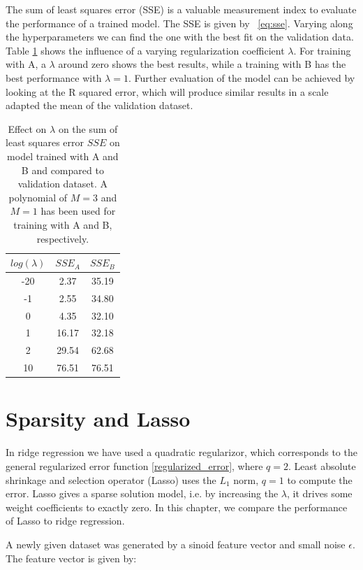 The sum of least squares error (SSE) is a valuable measurement index to evaluate the performance of a trained model. The SSE is given by ~\cref{eq:sse}. Varying along the hyperparameters we can find the one with the best fit on the validation data. Table \ref{table_sse} shows the influence of a varying regularization coefficient $\lambda$. For training with A, a $\lambda$ around zero shows the best results, while a training with B has the best performance with $\lambda = 1$. Further evaluation of the model can be achieved by looking at the R squared error, which will produce similar results in a scale adapted the mean of the validation dataset. 

\begin{table}[ht!]
\centering
\begin{tabular}{||c c c||}  
 \hline
 $log(\lambda)$ & $SSE_A$ & $SSE_B$ \\ [0.5ex] 
 \hline\hline
 -20 & 2.37 & 35.19 \\ 
 \hline
 -1 & 2.55 & 34.80 \\
 \hline
 0 & 4.35 & 32.10 \\
 \hline
 1 & 16.17 & 32.18 \\
 \hline
 2 & 29.54 & 62.68 \\
 \hline
 10 & 76.51 & 76.51 \\ [1ex] 
 \hline
\end{tabular}
\caption{Effect on $\lambda$ on the sum of least squares error $SSE$ on model trained with A and B and compared to validation dataset. A polynomial of $M=3$ and $M=1$ has been used for training with A and B, respectively.}
\label{table_sse}
\end{table}

\section{Sparsity and Lasso}
In ridge regression we have used a quadratic regularizor, which corresponds to the general regularized error function \ref{regularized_error}, where $q = 2$. Least absolute shrinkage and selection operator (Lasso) uses the $L_1$ norm, $q = 1$ to compute the error. Lasso gives a sparse solution model, i.e. by increasing the $\lambda$, it drives some weight coefficients to exactly zero. In this chapter, we compare the performance of Lasso to ridge regression. 

A newly given dataset was generated by a sinoid feature vector and small noise $\epsilon$. The feature vector is given by:

